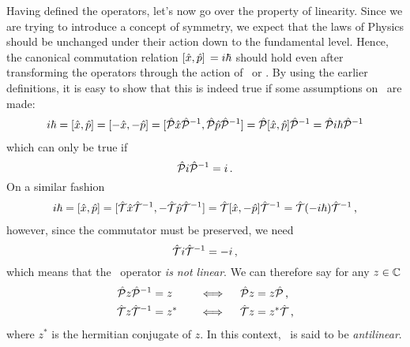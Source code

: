         Having defined the operators, let's now go over the property of linearity. Since we are trying to introduce a concept of symmetry, we expect that the laws of Physics should be unchanged under their action down to the fundamental level. Hence, the canonical commutation relation $\comm*{\hx}{\hp} = i \hbar$ should hold even after transforming the operators through the action of \hP\ or \hT. By using the earlier definitions, it is easy to show that this is indeed true if some assumptions on \hT\ are made:
        \begin{align*}
            i \hbar 
            = \comm*{\hx}{\hp}\! 
            = \comm*{-\hx}{-\hp} \!
            = \comm*{\hP \hx \hP^{-1}}{\hP \hp \hP^{-1}}\! 
            = \hP \comm*{\hx}{\hp}\! \hP^{-1} 
            = \hP i \hbar \hP^{-1} 
        \end{align*}
        which can only be true if
        \begin{equation}
            \label{eq:PiP}
            \mathcal{\hat{P}} i \mathcal{\hat{P}}^{-1} = i
            \,\text{.}
        \end{equation}
        On a similar fashion
        \begin{align*}
            i \hbar
            = \comm*{\hx}{\hp}\! 
            = \comm*{\hT \hx \hT^{-1}}{-\hT \hp \hT^{-1}}\! 
            = \hT \comm*{\hx}{-\hp}\! \hT^{-1}
            = \hT \pqty{-i \hbar} \hT^{-1}
            \mycomma
        \end{align*}
        however, since the commutator must be preserved, we need
        \begin{equation}
            \label{eq:TiT}
            \mathcal{\hat{T}} i \mathcal{\hat{T}}^{-1} = -i
            \,\text{,}
        \end{equation}
        which means that the \hT\ operator \emph{is not linear}. We can therefore say for any $z \in \mathbb{C}$ 
        \begin{alignat}{3}
            \label{eq:P-linear}
            \mathcal{\hat{P}} z \mathcal{\hat{P}}^{-1} &= z        
            &\quad\iff\quad 
            \mathcal{\hat{P}} z &= z \mathcal{\hat{P}}
            \,\text{,}
            \\
            \label{eq:T-antilinear}
            \mathcal{\hat{T}} z \mathcal{\hat{T}}^{-1} &= z^* 
            &\quad\iff\quad 
            \mathcal{\hat{T}} z &= z^* \mathcal{\hat{T}}
            \,\text{,}
        \end{alignat}
        where $z^*$ is the hermitian conjugate %
        of $z$. In this context, \hT\ is said to be \emph{antilinear}.

